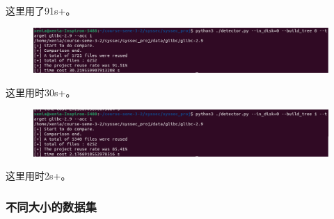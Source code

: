 \documentclass{cjc}
\begin{document}
   这里用了91s+。


\begin{figure}[htb]
  \centering
  \includegraphics[width=\linewidth]{pics/image-20220622221549800.png}
\end{figure}

   这里用时30s+。

\begin{figure}[htb]
  \centering
  \includegraphics[width=\linewidth]{pics/image-20220622221526098.png}
\end{figure}

   这里用时2s+。

   

\subsubsection{ 不同大小的数据集}
   

   











\end{document}
